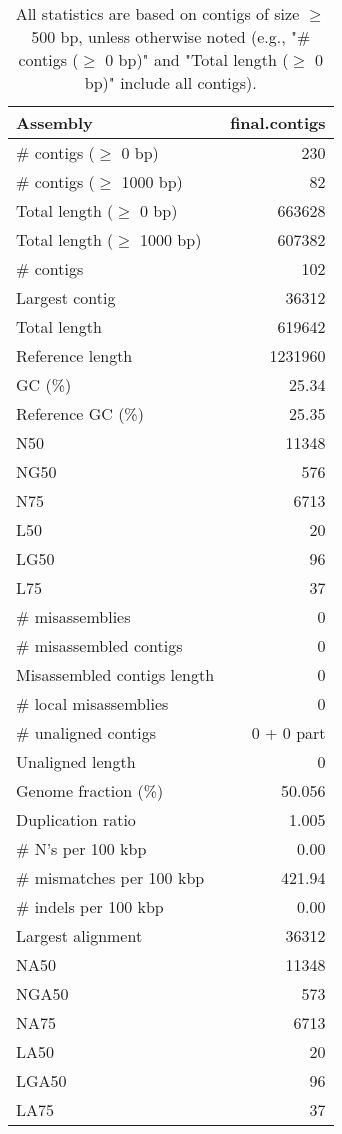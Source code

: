 \documentclass[12pt,a4paper]{article}
\begin{document}
\begin{table}[ht]
\begin{center}
\caption{All statistics are based on contigs of size $\geq$ 500 bp, unless otherwise noted (e.g., "\# contigs ($\geq$ 0 bp)" and "Total length ($\geq$ 0 bp)" include all contigs).}
\begin{tabular}{|l*{1}{|r}|}
\hline
Assembly & final.contigs \\ \hline
\# contigs ($\geq$ 0 bp) & 230 \\ \hline
\# contigs ($\geq$ 1000 bp) & 82 \\ \hline
Total length ($\geq$ 0 bp) & 663628 \\ \hline
Total length ($\geq$ 1000 bp) & 607382 \\ \hline
\# contigs & 102 \\ \hline
Largest contig & 36312 \\ \hline
Total length & 619642 \\ \hline
Reference length & 1231960 \\ \hline
GC (\%) & 25.34 \\ \hline
Reference GC (\%) & 25.35 \\ \hline
N50 & 11348 \\ \hline
NG50 & 576 \\ \hline
N75 & 6713 \\ \hline
L50 & 20 \\ \hline
LG50 & 96 \\ \hline
L75 & 37 \\ \hline
\# misassemblies & 0 \\ \hline
\# misassembled contigs & 0 \\ \hline
Misassembled contigs length & 0 \\ \hline
\# local misassemblies & 0 \\ \hline
\# unaligned contigs & 0 + 0 part \\ \hline
Unaligned length & 0 \\ \hline
Genome fraction (\%) & 50.056 \\ \hline
Duplication ratio & 1.005 \\ \hline
\# N's per 100 kbp & 0.00 \\ \hline
\# mismatches per 100 kbp & 421.94 \\ \hline
\# indels per 100 kbp & 0.00 \\ \hline
Largest alignment & 36312 \\ \hline
NA50 & 11348 \\ \hline
NGA50 & 573 \\ \hline
NA75 & 6713 \\ \hline
LA50 & 20 \\ \hline
LGA50 & 96 \\ \hline
LA75 & 37 \\ \hline
\end{tabular}
\end{center}
\end{table}
\end{document}
